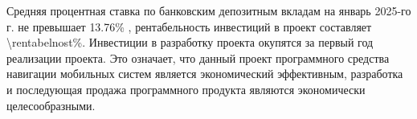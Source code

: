 Средняя процентная ставка по банковским депозитным вкладам на январь
2025-го г. не превышает \num{13.76}\% \cite{nbrb2025}, рентабельность инвестиций
в проект составляет \num{\rentabelnost}\%. Инвестиции в разработку проекта
окупятся за первый год реализации проекта. Это означает, что данный проект
программного средства навигации мобильных систем является экономический
эффективным, разработка и последующая продажа программного продукта являются
экономически целесообразными.


\renewcommand{\bibsection}{\sectioncentered*{Список использованной литературы}}


